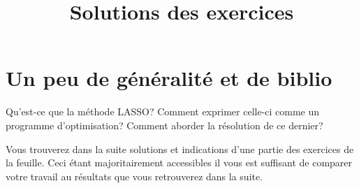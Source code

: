 \documentclass[11pt, a4paper]{article}
\begin{document}
\section{Un peu de généralité et de biblio}

\begin{question}
  Qu'est-ce que la méthode LASSO? Comment exprimer celle-ci comme un
  programme d'optimisation? Comment aborder la résolution de ce
  dernier?
\end{question}

\pretitle{\vspace{-2\baselineskip} \begin{center}}
\title{%
  { \huge Solutions des exercices}%
}
\posttitle{
\end{center}
  \vspace{.5\baselineskip}
  \rule{\textwidth}{1.5pt}
  \vspace{-5\baselineskip}
}

\maketitle\thispagestyle{fancy}

\noindent Vous trouverez dans la suite solutions et indications d'une
partie des exercices de la feuille. Ceci étant majoritairement
accessibles il vous est suffisant de comparer votre travail au
résultats que vous retrouverez dans la suite.

\printsolutions
\end{document}
